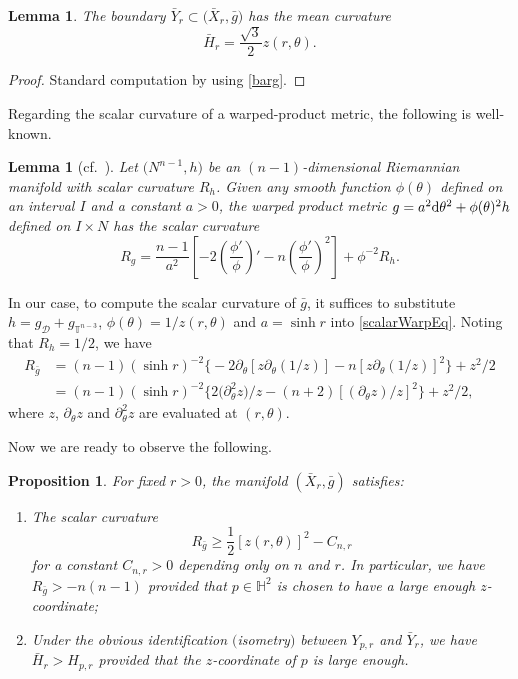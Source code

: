 \documentclass[10pt,a4paper]{amsart}
\numberwithin{equation}{section}
\newtheorem{Lemma}[Theorem]{Lemma}
\newtheorem{Prop}[Theorem]{Proposition}
\def\H{\mathbb{H}}
\def\T{\mathbb{T}}
\def\Dcal{\mathcal{D}}
\def\ed{{\rm d}}
\begin{document}
\begin{Lemma}%
The boundary $\bar Y_r\subset \bigl(\bar X_r, \bar g\bigr)$ has the mean curvature
\begin{equation}\label{barHr}
\bar H_r=\frac{\sqrt{3}}{2}z(r,\theta).
\end{equation}
\end{Lemma}
\begin{proof}
Standard computation by using \eqref{barg}.
\end{proof}


Regarding the scalar curvature of a warped-product metric,
the following is well-known.

\begin{Lemma}[{cf.~\cite[Proposition 7.33]{GL1983}}]\label{scalarwarp}
Let $\bigl(N^{n-1}, h\bigr)$ be an $(n-1)$-dimensional Riemannian manifold with scalar curvature $R_h$. Given any smooth function $\phi(\theta)$ defined on an
interval $I$ and a constant $a>0$, the warped product metric
$
	g = a^2\ed\theta^2+ \phi(\theta)^2 h
$
defined on $I\times N$ has the scalar curvature
\begin{equation}\label{scalarWarpEq}
R_g=\frac{n-1}{a^2}\left[-2\left(\frac{\phi'}{\phi}\right)'-n\left(\frac{\phi'}{\phi}\right)^2\right]+ \phi^{-2}R_{h}.
\end{equation}
\end{Lemma}

In our case, to compute the scalar curvature of $\bar g$, it suffices to substitute
$h = g_\Dcal + g_{\T^{n-3}}$, $\phi(\theta) = 1/z(r,\theta)$ and $a = \sinh r$ into \eqref{scalarWarpEq}. Noting that
$R_h = 1/2$, we have
\begin{align}
	R_{\bar g}&=(n-1)(\sinh r)^{-2}\bigl\{-2\partial_\theta[z\partial_\theta(1/z)]-n[z\partial_\theta(1/z)]^2\bigr\} + z^{2}/2\nonumber\\
	&=(n-1)(\sinh r)^{-2}\bigl\{2\bigl(\partial_\theta^2 z\bigr)/z-(n+2)[(\partial_\theta z)/z]^2\bigr\}	+ z^{2}/2,\label{Rgbar}
		\end{align}		
where $z$, $\partial_\theta z$ and $\partial_\theta^2 z$ are evaluated at $(r,\theta)$.

Now we are ready to observe the following.

\begin{Prop}\label{XrbarInfo}
For fixed $r>0$, the manifold $(\bar X_r, \bar g)$ satisfies:
\begin{enumerate}\itemsep=0pt
\item[$(a)$]  The scalar curvature
\[
	R_{\bar g}\geq \frac{1}{2}[z(r,\theta)]^2-C_{n,r}
\] for a
constant $C_{n,r}>0$ depending only on $n$ and $r$. In particular, we have
$
R_{\bar g}>-n(n-1)
$
provided that $p\in \H^2$ is chosen to have a large enough $z$-coordinate;

\item[$(b)$] Under the obvious identification $($isometry$)$ between $Y_{p,r}$ and $\bar Y_r$, we have
 $\bar H_r >H_{p,r}$ provided that the $z$-coordinate of $p$ is large enough.
 \end{enumerate}
\end{Prop}
\end{document}
